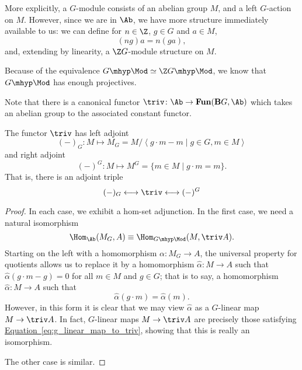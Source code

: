 \documentclass[main.tex]{subfiles}
\begin{document}
More explicitly, a $G$-module consists of an abelian group $M$, and a left $G$-action on $M$. However, since we are in $\Ab$, we have more structure immediately available to us: we can define for $n \in \Z$, $g \in G$ and $a \in M$,
\begin{equation*}
  (ng)a = n(ga),
\end{equation*}
and, extending by linearity, a $\Z G$-module structure on $M$.

Because of the equivalence $G\mhyp\Mod \simeq \Z G\mhyp\Mod$, we know that $G\mhyp\Mod$ has enough projectives.

Note that there is a canonical functor $\triv\colon \Ab \to \mathbf{Fun}(\mathbf{B}G, \Ab)$ which takes an abelian group to the associated constant functor.
\begin{proposition}
  The functor $\triv$ has left adjoint
  \begin{equation*}
    (-)_{G}\colon M \mapsto M_{G} = M/\left\langle g\cdot m - m \mid g \in G, m \in M \right\rangle
  \end{equation*}
  and right adjoint
  \begin{equation*}
    (-)^{G}\colon M \mapsto M^{G} = \{m \in M \mid g\cdot m = m\}.
  \end{equation*}
  That is, there is an adjoint triple
  \begin{equation*}
    (-)_{G} \longleftrightarrow \triv \longleftrightarrow (-)^{G}
  \end{equation*}
\end{proposition}
\begin{proof}
  In each case, we exhibit a hom-set adjunction. In the first case, we need a natural isomorphism
  \begin{equation*}
    \Hom_{\Ab}(M_{G}, A) \equiv \Hom_{G\mhyp\Mod}(M, \triv A).
  \end{equation*}
  Starting on the left with a homomorphism $\alpha\colon M_{G} \to A$, the universal property for quotients allows us to replace it by a homomorphism $\hat{\alpha}\colon M \to A$ such that $\hat{\alpha}(g\cdot m - g) = 0$ for all $m \in M$ and $g \in G$; that is to say, a homomorphism $\hat{\alpha}\colon M \to A$ such that
  \begin{equation}
    \label{eq:g_linear_map_to_triv}
    \hat{\alpha}(g\cdot m) = \hat{\alpha}(m).
  \end{equation}
  However, in this form it is clear that we may view $\hat{\alpha}$ as a $G$-linear map $M \to \triv A$. In fact, $G$-linear maps $M \to \triv A$ are precisely those satisfying \hyperref[eq:g_linear_map_to_triv]{Equation~\ref*{eq:g_linear_map_to_triv}}, showing that this is really an isomorphism.

  The other case is similar.
\end{proof}
\end{document}
